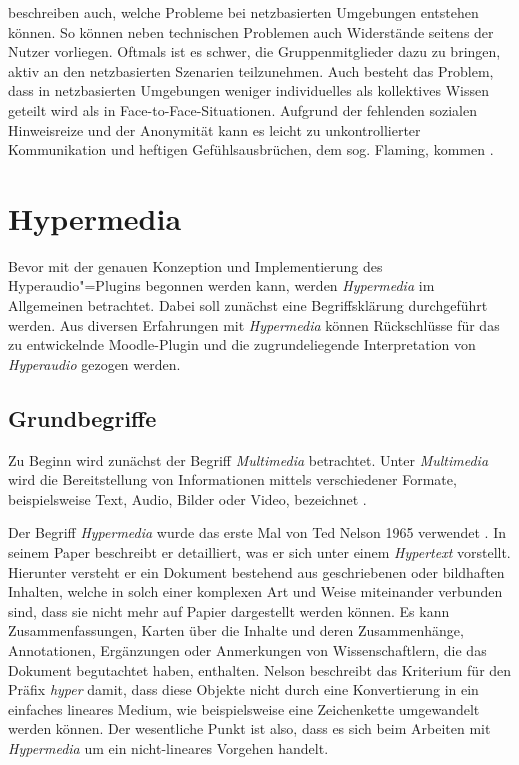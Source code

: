 \cite{reinmann2002analyse} beschreiben auch, welche Probleme bei netzbasierten Umgebungen entstehen können. So können neben technischen Problemen auch Widerstände seitens der Nutzer vorliegen. Oftmals ist es schwer, die Gruppenmitglieder dazu zu bringen, aktiv an den netzbasierten Szenarien teilzunehmen. Auch besteht das Problem, dass in netzbasierten Umgebungen weniger individuelles als kollektives Wissen geteilt wird als in Face-to-Face-Situationen. Aufgrund der fehlenden sozialen Hinweisreize und der Anonymität kann \glqq es leicht zu unkontrollierter Kommunikation und heftigen Gefühlsausbrüchen, dem sog. Flaming, kommen\grqq{} \citep{reinmann2002analyse}.


\section{Hypermedia}
Bevor mit der genauen Konzeption und Implementierung des Hyperaudio"=Plugins begonnen werden kann, werden \textit{Hypermedia} im Allgemeinen betrachtet. Dabei soll zunächst eine Begriffsklärung durchgeführt werden. Aus diversen Erfahrungen mit \textit{Hypermedia} können Rückschlüsse für das zu entwickelnde Moodle-Plugin und die zugrundeliegende Interpretation von \textit{Hyperaudio} gezogen werden.


\subsection{Grundbegriffe}
Zu Beginn wird zunächst der Begriff \textit{Multimedia} betrachtet. Unter \textit{Multimedia} wird die Bereitstellung von Informationen mittels verschiedener Formate, beispielsweise Text, Audio, Bilder oder Video, bezeichnet \citep{mayer2009multimedia,moos2010multimedia}.

Der Begriff \textit{Hypermedia} wurde das erste Mal von Ted Nelson 1965 verwendet \citep{nelson1965complex}. In seinem Paper beschreibt er detailliert, was er sich unter einem \textit{Hypertext} vorstellt. Hierunter versteht er ein Dokument bestehend aus geschriebenen oder bildhaften Inhalten, welche in solch einer komplexen Art und Weise miteinander verbunden sind, dass sie nicht mehr auf Papier dargestellt werden können. Es kann Zusammenfassungen, Karten über die Inhalte und deren Zusammenhänge, Annotationen, Ergänzungen oder Anmerkungen von Wissenschaftlern, die das Dokument begutachtet haben, enthalten. Nelson beschreibt das Kriterium für den Präfix \textit{hyper} damit, dass diese Objekte nicht durch eine Konvertierung in ein einfaches lineares Medium, wie beispielsweise eine Zeichenkette umgewandelt werden können. Der wesentliche Punkt ist also, dass es sich beim Arbeiten mit \textit{Hypermedia} um ein nicht-lineares Vorgehen handelt.

